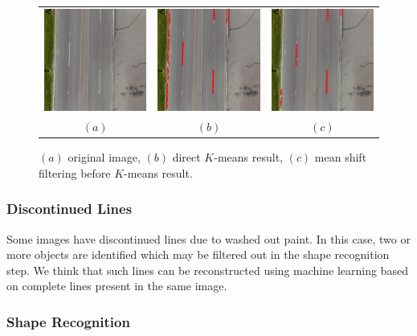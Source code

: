 \documentclass{m2pi}
\begin{document}
\begin{figure}[htp]
\centering
\begin{tabular}{ccc}
\includegraphics[width=3.8cm]{figures/Resized_Road3.jpg}&
\includegraphics[width=3.8cm]{figures/Detected_Road3.jpg}&
\includegraphics[width=3.8cm]{figures/Detected_Road3_meanshift.jpg}\\
$(a)$ & $(b)$ & $(c)$
\end{tabular}
\caption{$(a)$ original image, 
$(b)$ direct $K$-means result,
$(c)$ mean shift filtering before $K$-means result.}
\label{road3result}
\end{figure}

\subsubsection{Discontinued Lines}

Some images have discontinued lines due to washed out paint. In this case, two or more objects are identified which may be filtered out in the shape recognition step. We think that such lines can be reconstructed using machine learning based on complete lines present in the same image.

\subsubsection{Shape Recognition}
\end{document}
